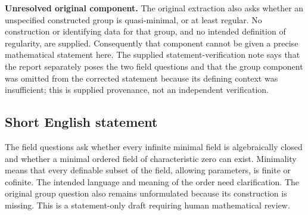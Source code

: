 \documentclass[11pt]{article}
\begin{document}
\textbf{Unresolved original component.} The original extraction also asks whether an unspecified constructed group is quasi-minimal, or at least regular. No construction or identifying data for that group, and no intended definition of regularity, are supplied. Consequently that component cannot be given a precise mathematical statement here. The supplied statement-verification note says that the report separately poses the two field questions and that the group component was omitted from the corrected statement because its defining context was insufficient; this is supplied provenance, not an independent verification.
\subsection{Short English statement}
The field questions ask whether every infinite minimal field is algebraically closed and whether a minimal ordered field of characteristic zero can exist. Minimality means that every definable subset of the field, allowing parameters, is finite or cofinite. The intended language and meaning of the order need clarification. The original group question also remains unformulated because its construction is missing. This is a statement-only draft requiring human mathematical review.
\end{document}
